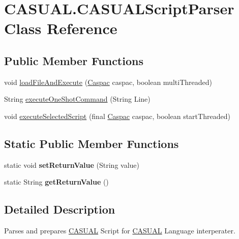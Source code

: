\hypertarget{class_c_a_s_u_a_l_1_1_c_a_s_u_a_l_script_parser}{\section{C\-A\-S\-U\-A\-L.\-C\-A\-S\-U\-A\-L\-Script\-Parser Class Reference}
\label{class_c_a_s_u_a_l_1_1_c_a_s_u_a_l_script_parser}
}
\subsection*{Public Member Functions}
\begin{DoxyCompactItemize}
\item 
void \hyperlink{class_c_a_s_u_a_l_1_1_c_a_s_u_a_l_script_parser_af3522851b007af1b1e00999bb5b966ba}{load\-File\-And\-Execute} (\hyperlink{class_c_a_s_u_a_l_1_1caspac_1_1_caspac}{Caspac} caspac, boolean multi\-Threaded)
\item 
String \hyperlink{class_c_a_s_u_a_l_1_1_c_a_s_u_a_l_script_parser_a05f4f6b1fd11ab2d710a4307f2104754}{execute\-One\-Shot\-Command} (String Line)
\item 
void \hyperlink{class_c_a_s_u_a_l_1_1_c_a_s_u_a_l_script_parser_a6cee6a59d0ab94efd5de33b87d80cc48}{execute\-Selected\-Script} (final \hyperlink{class_c_a_s_u_a_l_1_1caspac_1_1_caspac}{Caspac} caspac, boolean start\-Threaded)
\end{DoxyCompactItemize}
\subsection*{Static Public Member Functions}
\begin{DoxyCompactItemize}
\item 
\hypertarget{class_c_a_s_u_a_l_1_1_c_a_s_u_a_l_script_parser_a6834983003de4d6f3e8a2750ee6257cd}{static void {\bfseries set\-Return\-Value} (String value)}\label{class_c_a_s_u_a_l_1_1_c_a_s_u_a_l_script_parser_a6834983003de4d6f3e8a2750ee6257cd}

\item 
\hypertarget{class_c_a_s_u_a_l_1_1_c_a_s_u_a_l_script_parser_a773303f9eafa3f741c93afc07e2c31fd}{static String {\bfseries get\-Return\-Value} ()}\label{class_c_a_s_u_a_l_1_1_c_a_s_u_a_l_script_parser_a773303f9eafa3f741c93afc07e2c31fd}

\end{DoxyCompactItemize}


\subsection{Detailed Description}
Parses and prepares \hyperlink{namespace_c_a_s_u_a_l}{C\-A\-S\-U\-A\-L} Script for \hyperlink{namespace_c_a_s_u_a_l}{C\-A\-S\-U\-A\-L} Language interperater.

